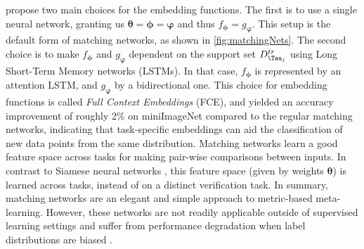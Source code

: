  propose two main choices for the embedding functions. The first is to use a single neural network, granting us $\boldsymbol{\theta} = \boldsymbol{\phi} = \boldsymbol{\varphi}$ and thus $f_{\boldsymbol{\phi}} = g_{\boldsymbol{\varphi}}$. This setup is the default form of matching networks, as shown in \autoref{fig:matchingNets}. The second choice is to make $f_{\boldsymbol{\phi}}$ and $g_{\boldsymbol{\varphi}}$ dependent on the support set $D^{tr}_{\Tau_{j}}$ using Long Short-Term Memory networks (LSTMs). In that case, $f_{\boldsymbol{\phi}}$ is represented by an attention LSTM, and $g_{\boldsymbol{\varphi}}$ by a bidirectional one. This choice for embedding functions is called \textit{Full Context Embeddings} (FCE), and yielded an accuracy improvement of roughly 2\% on miniImageNet compared to the regular matching networks, indicating that task-specific embeddings can aid the classification of new data points from the same distribution. 
Matching networks learn a good feature space across tasks for making pair-wise comparisons between inputs. In contrast to Siamese neural networks , this feature space (given by weights $\boldsymbol{\theta}$) is learned across tasks, instead of on a distinct verification task. 
In summary, matching networks are an elegant and simple approach to metric-based meta-learning. However, these networks are not readily applicable outside of supervised learning settings and suffer from performance degradation when label distributions are biased .

